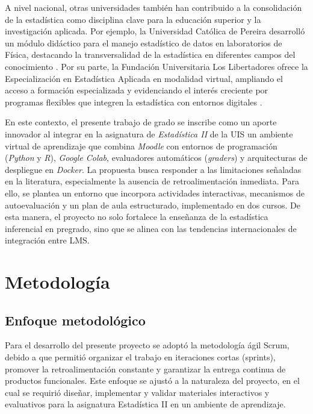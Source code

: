 \documentclass[letter,oneside,12pt,spanish]{report}
\begin{document}
A nivel nacional, otras universidades también han contribuido a la consolidación de la estadística
 como disciplina clave para la educación superior y la investigación aplicada. Por ejemplo, la 
 Universidad Católica de Pereira desarrolló un módulo didáctico para el manejo estadístico de 
 datos en laboratorios de Física, destacando la transversalidad de la estadística en diferentes 
 campos del conocimiento \parencite{ucp2018}. Por su parte, la Fundación Universitaria Los 
 Libertadores ofrece la Especialización en Estadística Aplicada en modalidad virtual, ampliando 
 el acceso a formación especializada y evidenciando el interés creciente por programas flexibles 
 que integren la estadística con entornos digitales \parencite{libertadoressf}.

En este contexto, el presente trabajo de grado se inscribe como un aporte innovador al 
integrar en la asignatura de \textit{Estadística II} de la UIS un ambiente virtual de aprendizaje 
que combina \textit{Moodle} con entornos de programación (\textit{Python} y \textit{R}), 
\textit{Google Colab}, evaluadores automáticos (\textit{graders}) y arquitecturas de despliegue en 
\textit{Docker}. La propuesta busca responder a las limitaciones señaladas en la literatura, 
especialmente la ausencia de retroalimentación inmediata. Para ello, se plantea un entorno que 
incorpora actividades interactivas, mecanismos de autoevaluación y un plan de aula estructurado, 
implementado en dos cursos. De esta manera, el proyecto no solo fortalece la enseñanza de la 
estadística inferencial en pregrado, sino que se alinea con las tendencias internacionales de 
integración entre LMS.

\newpage

\chapter{Metodología}

\section{Enfoque metodológico}

Para el desarrollo del presente proyecto se adoptó la metodología ágil Scrum, debido a que permitió organizar el trabajo en iteraciones cortas (sprints), promover la retroalimentación constante y garantizar la entrega continua de productos funcionales. Este enfoque se ajustó a la naturaleza del proyecto, en el cual se requirió diseñar, implementar y validar materiales interactivos y evaluativos para la asignatura Estadística II en un ambiente de aprendizaje.
\end{document}
